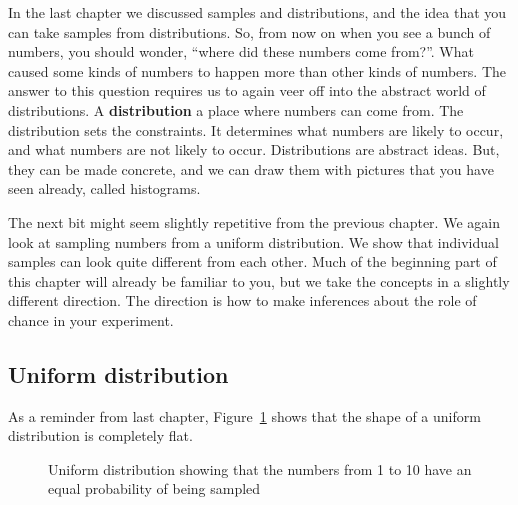 \documentclass[
  letterpaper,
  DIV=11,
  numbers=noendperiod]{scrreprt}
\begin{document}
In the last chapter we discussed samples and distributions, and the idea
that you can take samples from distributions. So, from now on when you
see a bunch of numbers, you should wonder, ``where did these numbers
come from?''. What caused some kinds of numbers to happen more than
other kinds of numbers. The answer to this question requires us to again
veer off into the abstract world of distributions. A
\textbf{distribution} a place where numbers can come from. The
distribution sets the constraints. It determines what numbers are likely
to occur, and what numbers are not likely to occur. Distributions are
abstract ideas. But, they can be made concrete, and we can draw them
with pictures that you have seen already, called histograms.

The next bit might seem slightly repetitive from the previous chapter.
We again look at sampling numbers from a uniform distribution. We show
that individual samples can look quite different from each other. Much
of the beginning part of this chapter will already be familiar to you,
but we take the concepts in a slightly different direction. The
direction is how to make inferences about the role of chance in your
experiment.

\subsection{Uniform distribution}\label{uniform-distribution}

As a reminder from last chapter, Figure~\ref{fig-5unifagain} shows that
the shape of a uniform distribution is completely flat.

\begin{figure}


\caption{\label{fig-5unifagain}Uniform distribution showing that the
numbers from 1 to 10 have an equal probability of being sampled}

\end{figure}%
\end{document}

